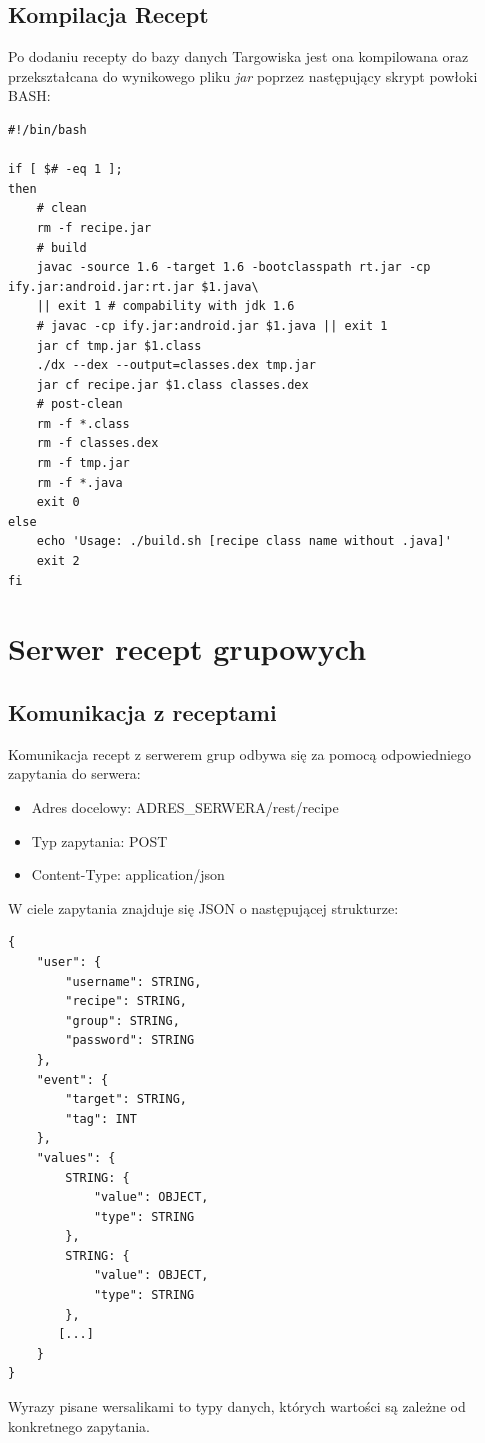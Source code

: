 \documentclass[11pt,a4paper,polish,thesis]{dcsbook}
\begin{document}
\subsection{Kompilacja Recept}
Po dodaniu recepty do bazy danych Targowiska jest ona kompilowana oraz przekształcana do wynikowego pliku \emph{jar} poprzez następujący skrypt powłoki BASH:
\begin{verbatim}
#!/bin/bash

if [ $# -eq 1 ];
then
    # clean
    rm -f recipe.jar
    # build
    javac -source 1.6 -target 1.6 -bootclasspath rt.jar -cp ify.jar:android.jar:rt.jar $1.java\
    || exit 1 # compability with jdk 1.6
    # javac -cp ify.jar:android.jar $1.java || exit 1
    jar cf tmp.jar $1.class
    ./dx --dex --output=classes.dex tmp.jar
    jar cf recipe.jar $1.class classes.dex
    # post-clean
    rm -f *.class
    rm -f classes.dex
    rm -f tmp.jar
    rm -f *.java
    exit 0
else
    echo 'Usage: ./build.sh [recipe class name without .java]'
    exit 2
fi
\end{verbatim}
\section{Serwer recept grupowych}
\subsection{Komunikacja z receptami}
Komunikacja recept z serwerem grup odbywa się za pomocą odpowiedniego zapytania do serwera:
\begin{itemize}
\item Adres docelowy: ADRES\_SERWERA/rest/recipe
\item Typ zapytania: POST
\item Content-Type: application/json
\end{itemize}

W ciele zapytania znajduje się JSON o następującej strukturze:
\begin{verbatim}
{
    "user": {
        "username": STRING,
        "recipe": STRING,
        "group": STRING,
        "password": STRING
    },
    "event": {
        "target": STRING,
        "tag": INT
    },
    "values": {
        STRING: {
            "value": OBJECT,
            "type": STRING
        },
        STRING: {
            "value": OBJECT,
            "type": STRING
        },
       [...]
    }
}
\end{verbatim}

Wyrazy pisane wersalikami to typy danych, których wartości są zależne od konkretnego zapytania.
\end{document}
